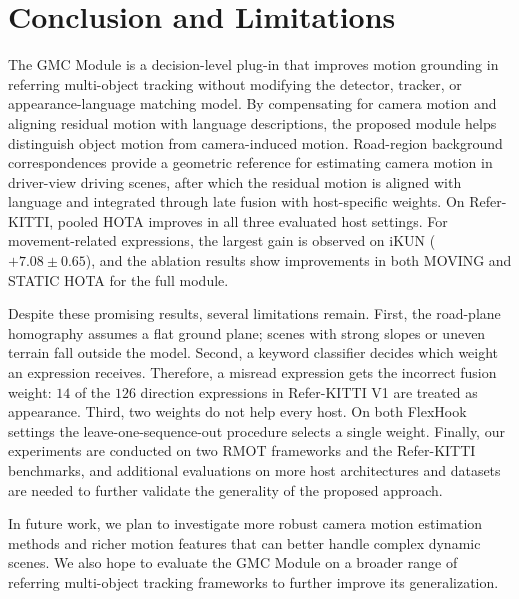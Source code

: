 \documentclass{article}
\begin{document}
\section{Conclusion and Limitations}
\label{sec:conclusion}
The GMC Module is a decision-level plug-in that improves motion grounding in referring multi-object tracking without modifying the detector, tracker, or appearance-language matching model. By compensating for camera motion and aligning residual motion with language descriptions, the proposed module helps distinguish object motion from camera-induced motion. Road-region background correspondences provide a geometric reference for estimating camera motion in driver-view driving scenes, after which the residual motion is aligned with language and integrated through late fusion with host-specific weights. On Refer-KITTI, pooled HOTA improves in all three evaluated host settings. For movement-related expressions, the largest gain is observed on iKUN ($+7.08\pm0.65$), and the ablation results show improvements in both MOVING and STATIC HOTA for the full module.

Despite these promising results, several limitations remain. First, the road-plane homography assumes a flat ground plane; scenes with strong slopes or uneven terrain fall outside the model. Second, a keyword classifier decides which weight an expression receives. Therefore, a misread expression gets the incorrect fusion weight: $14$ of the $126$ direction expressions in Refer-KITTI V1 are treated as appearance. Third, two weights do not help every host. On both FlexHook settings the leave-one-sequence-out procedure selects a single weight. Finally, our experiments are conducted on two RMOT frameworks and the Refer-KITTI benchmarks, and additional evaluations on more host architectures and datasets are needed to further validate the generality of the proposed approach.

In future work, we plan to investigate more robust camera motion estimation methods and richer motion features that can better handle complex dynamic scenes. We also hope to evaluate the GMC Module on a broader range of referring multi-object tracking frameworks to further improve its generalization.



\end{document}
